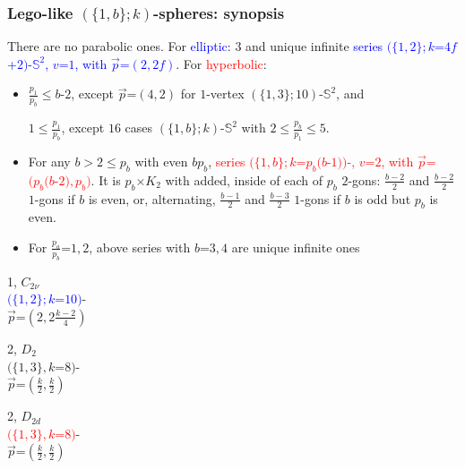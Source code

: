 \documentclass{beamer}
\begin{document}
\begin{frame}\frametitle{Lego-like   $(\{1,b\}; k)$-spheres: synopsis}
\vspace{-2mm}
There are no parabolic ones.  For \textcolor{blue}{elliptic}:  $3$ and unique infinite \textcolor{blue}{series  
   $(\{1,2\}; k$=$4f$+$2)$-$\mathbb{S}^2$,   $v$=$1$,
   with 
   $\vec{p}$=$(2,2f)$}. For \textcolor{red}{hyperbolic}:
\begin{itemize}
\item $\frac{p_1}{p_b}$$\le$$ b$-$2$, except  $\vec{p}$=$(4,2)$ for $1$-vertex
$(\{1,3\};10)$-$\mathbb{S}^2$,    and 
   
   $1$$\le$$\frac{p_1}{p_b}$, except    
   $16$ cases    $(\{1,b\};k)$-$\mathbb{S}^2$   
    with $2$$\le $$\frac{p_b}{p_1} $$\le $$5$.   
\item For any $b$$>$$2$$\le$$ p_b$ with even $bp_b$, \textcolor{red}{series $(\{1,b\};k$=$p_b(b$-$1))$-,
$v$=$2$, with
   $\vec{p}$=$(p_b(b$-$2),p_b)$}.  It is   $p_b$$\times$$ K_2$
 with added, inside of each of  $p_b$ $2$-gons:
 $\frac{b-2}{2}$ and $\frac{b-2}{2}$ $1$-gons if $b$ is even, or, alternating, $\frac{b-1}{2}$  and    $\frac{b-3}{2}$ $1$-gons 
if $b$ is odd but $p_b$ is even.
\item For $\frac{p_a}{p_b}$=$1,2$, above series with $b$=$3,4$ are unique infinite ones   
   \end{itemize}
\begin{center}
\begin{minipage}{1.5cm}\centering
{}\par
1, $C_{2\nu}$\\
\textcolor{blue}{$(\{1, 2\};k$=$10)$}-\\
\vspace{-5mm}$\vec{p}$=$(2,2\frac{k-2}{4})$
\end{minipage}
\hspace{10mm}
\begin{minipage}{1.5cm}
\centering
{}\par
2, $D_2$\\
$(\{1, 3\}, k$=$8)$-\\
\vspace{-5mm}
$\vec{p}$=$(\frac{k}{2},\frac{k}{2} )$
\end{minipage}
\hspace{21mm}
\begin{minipage}{1.5cm}\centering
{}\par
2, $D_{2d}$\\
\textcolor{red}{$(\{1, 3\}, k$=$8)$}-\\
\vspace{-5mm} $\vec{p}$=$(\frac{k}{2},\frac{k}{2})$
\end{minipage}
\end{center}


\end{frame}
\end{document}
